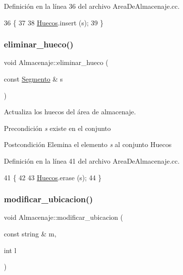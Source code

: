 Definición en la línea 36 del archivo Area\+De\+Almacenaje.\+cc.


\begin{DoxyCode}
36                                                \{
37     
38     \hyperlink{class_almacenaje_ac7f1f8559babe3ac7841bb7f9e50d79a}{Huecos}.insert (s);
39 \}
\end{DoxyCode}
\mbox{\label{class_almacenaje_a20219014a2d5bf325df7245cd0822277}} 
\subsubsection{\texorpdfstring{eliminar\+\_\+hueco()}{eliminar\_hueco()}}
{\footnotesize\ttfamily void Almacenaje\+::eliminar\+\_\+hueco (\begin{DoxyParamCaption}\item[{const \hyperlink{class_segmento}{Segmento} \&}]{s }\end{DoxyParamCaption})}



Actualiza los huecos del área de almacenaje. 

\begin{DoxyPrecond}{Precondición}
{\itshape s} existe en el conjunto 
\end{DoxyPrecond}
\begin{DoxyPostcond}{Postcondición}
Elemina el elemento {\itshape s} al conjunto Huecos 
\end{DoxyPostcond}


Definición en la línea 41 del archivo Area\+De\+Almacenaje.\+cc.


\begin{DoxyCode}
41                                                   \{
42     
43     \hyperlink{class_almacenaje_ac7f1f8559babe3ac7841bb7f9e50d79a}{Huecos}.erase (s);
44 \}
\end{DoxyCode}
\mbox{\label{class_almacenaje_a4e225d0899f7c49b3c513ed61f63b4ef}} 
\subsubsection{\texorpdfstring{modificar\+\_\+ubicacion()}{modificar\_ubicacion()}}
{\footnotesize\ttfamily void Almacenaje\+::modificar\+\_\+ubicacion (\begin{DoxyParamCaption}\item[{const string \&}]{m,  }\item[{int}]{l }\end{DoxyParamCaption})}



